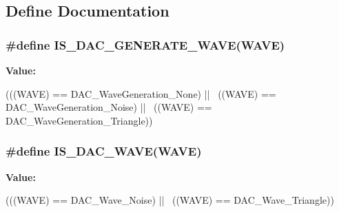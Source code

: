 \subsection{Define Documentation}
\hypertarget{group__DAC__wave__generation_ga50fb2dd12305cd7bd0b738a1f6388d3c}{
\subsubsection[{IS\_\-DAC\_\-GENERATE\_\-WAVE}]{\setlength{\rightskip}{0pt plus 5cm}\#define IS\_\-DAC\_\-GENERATE\_\-WAVE(WAVE)}}
\label{group__DAC__wave__generation_ga50fb2dd12305cd7bd0b738a1f6388d3c}
{\bfseries Value:}
\begin{DoxyCode}
(((WAVE) == DAC_WaveGeneration_None) || \
                                    ((WAVE) == DAC_WaveGeneration_Noise) || \
                                    ((WAVE) == DAC_WaveGeneration_Triangle))
\end{DoxyCode}
\hypertarget{group__DAC__wave__generation_ga45c25065fb713820f6dbae0009376e1c}{
\subsubsection[{IS\_\-DAC\_\-WAVE}]{\setlength{\rightskip}{0pt plus 5cm}\#define IS\_\-DAC\_\-WAVE(WAVE)}}
\label{group__DAC__wave__generation_ga45c25065fb713820f6dbae0009376e1c}
{\bfseries Value:}
\begin{DoxyCode}
(((WAVE) == DAC_Wave_Noise) || \
                           ((WAVE) == DAC_Wave_Triangle))
\end{DoxyCode}
